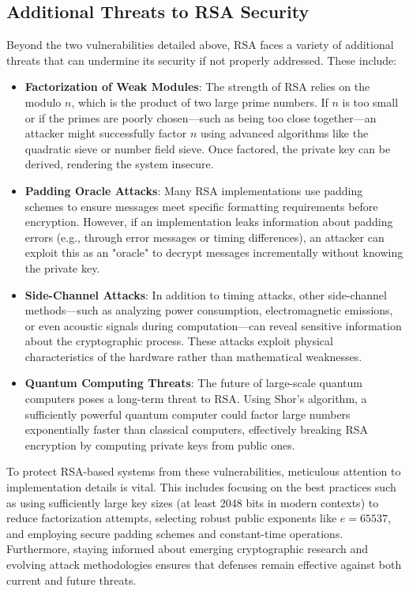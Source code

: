 \documentclass[11pt,a4paper]{article}
\numberwithin{equation}{section}
\begin{document}
\subsection{Additional Threats to RSA Security}
Beyond the two vulnerabilities detailed above, RSA faces a variety of additional threats that can undermine its security if not properly addressed. These include:

\begin{itemize}
    \item \textbf{Factorization of Weak Modules}: The strength of RSA relies on the modulo $n$, which is the product of two large prime numbers. If $n$ is too small or if the primes are poorly chosen—such as being too close together—an attacker might successfully factor $n$ using advanced algorithms like the quadratic sieve or number field sieve. Once factored, the private key can be derived, rendering the system insecure.

    \item \textbf{Padding Oracle Attacks}: Many RSA implementations use padding schemes to ensure messages meet specific formatting requirements before encryption. However, if an implementation leaks information about padding errors (e.g., through error messages or timing differences), an attacker can exploit this as an "oracle" to decrypt messages incrementally without knowing the private key.

    \item \textbf{Side-Channel Attacks}: In addition to timing attacks, other side-channel methods—such as analyzing power consumption, electromagnetic emissions, or even acoustic signals during computation—can reveal sensitive information about the cryptographic process. These attacks exploit physical characteristics of the hardware rather than mathematical weaknesses.

    \item \textbf{Quantum Computing Threats}: The future of large-scale quantum computers poses a long-term threat to RSA. Using Shor’s algorithm, a sufficiently powerful quantum computer could factor large numbers exponentially faster than classical computers, effectively breaking RSA encryption by computing private keys from public ones.
\end{itemize}
To protect RSA-based systems from these vulnerabilities, meticulous attention to implementation details is vital. This includes focusing on the best practices such as using sufficiently large key sizes (at least 2048 bits in modern contexts) to reduce factorization attempts, selecting robust public exponents like $e = 65537$, and employing secure padding schemes and constant-time operations. Furthermore, staying informed about emerging cryptographic research and evolving attack methodologies ensures that defenses remain effective against both current and future threats.
\end{document}
